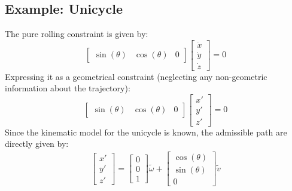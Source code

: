 \subsection{Example: Unicycle}
The pure rolling constraint is given by:
\begin{equation}\label{Pure_rolling}
    \begin{bmatrix}
        \sin(\theta) & \cos(\theta) & 0
    \end{bmatrix}
    \begin{bmatrix}
        \dot{x} \\ \dot{y} \\ \dot{z}
    \end{bmatrix}=0
\end{equation}
Expressing it as a geometrical constraint (neglecting any non-geometric information about the trajectory):
\begin{equation}
    \begin{bmatrix}
        \sin(\theta) & \cos(\theta) & 0
    \end{bmatrix}
    \begin{bmatrix}
        x' \\ y' \\ z'
    \end{bmatrix}=0
\end{equation}
Since the kinematic model for the unicycle is known, the admissible path are directly given by:
\begin{gather}\label{geo_uni_mod}
    \begin{bmatrix}
        x' \\ y' \\ z'
    \end{bmatrix}=
    \begin{bmatrix}
        0 \\ 0 \\ 1
    \end{bmatrix}\tilde{\omega} +
    \begin{bmatrix}
        \cos(\theta) \\ \sin(\theta) \\ 0
    \end{bmatrix} \tilde{v}
\end{gather}
